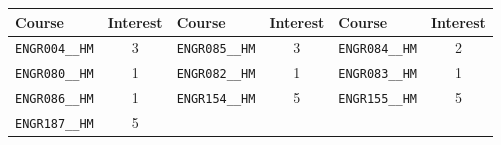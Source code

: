\begin{tabular}{|p{}|c||p{}|c||p{}|c|}
    \hline
    Course & Interest & Course & Interest & Course & Interest\\\hline
    \verb|ENGR004__HM| & 3&
    \verb|ENGR085__HM| & 3&
    \verb|ENGR084__HM| & 2\\
    \verb|ENGR080__HM| & 1&
    \verb|ENGR082__HM| & 1&
    \verb|ENGR083__HM| & 1\\
    \verb|ENGR086__HM| & 1&
    \verb|ENGR154__HM| & 5&
    \verb|ENGR155__HM| & 5\\
    \verb|ENGR187__HM| & 5&&&&\\
    \hline
\end{tabular}